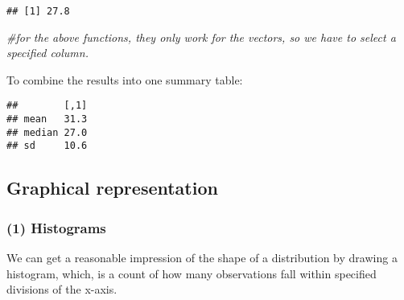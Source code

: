 \documentclass[]{book}
\newenvironment{Shaded}{\begin{snugshade}}{\end{snugshade}}
\newcommand{\KeywordTok}[1]{\textcolor[rgb]{0.13,0.29,0.53}{\textbf{#1}}}
\newcommand{\DataTypeTok}[1]{\textcolor[rgb]{0.13,0.29,0.53}{#1}}
\newcommand{\StringTok}[1]{\textcolor[rgb]{0.31,0.60,0.02}{#1}}
\newcommand{\CommentTok}[1]{\textcolor[rgb]{0.56,0.35,0.01}{\textit{#1}}}
\newcommand{\OperatorTok}[1]{\textcolor[rgb]{0.81,0.36,0.00}{\textbf{#1}}}
\newcommand{\NormalTok}[1]{#1}
\theoremstyle{definition}
\theoremstyle{definition}
\theoremstyle{definition}
\theoremstyle{remark}
\begin{document}
\begin{verbatim}
## [1] 27.8
\end{verbatim}

\begin{Shaded}
\begin{Highlighting}[]
\CommentTok{#for the above functions, they only work for the vectors, so we have to select a specified column.}
\end{Highlighting}
\end{Shaded}

To combine the results into one summary table:

\begin{Shaded}
\end{Shaded}

\begin{verbatim}
##        [,1]
## mean   31.3
## median 27.0
## sd     10.6
\end{verbatim}

\subsection{Graphical representation}\label{graphical-representation}

\subsubsection{(1) Histograms}\label{histograms}

We can get a reasonable impression of the shape of a distribution by
drawing a histogram, which, is a count of how many observations fall
within specified divisions of the x-axis.

\begin{Shaded}
\end{Shaded}
\end{document}

